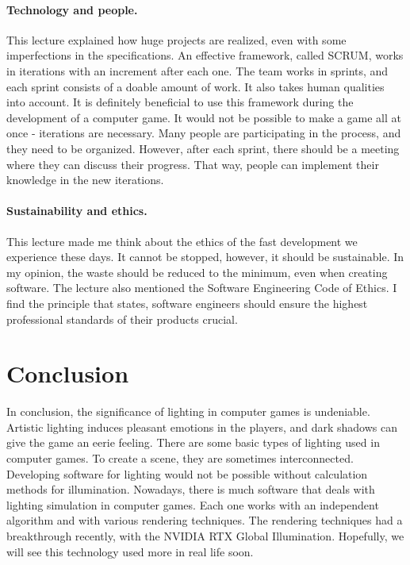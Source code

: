 \documentclass[10pt,twoside,english,a4paper]{article}
\begin{document}
\paragraph{Technology and people.}
This lecture explained how huge projects are realized, even with some imperfections in the specifications. An effective framework, called SCRUM, works in iterations with an increment after each one. The team works in sprints, and each sprint consists of a doable amount of work. It also takes human qualities into account. It is definitely beneficial to use this framework during the development of a computer game. It would not be possible to make a game all at once - iterations are necessary. Many people are participating in the process, and they need to be organized. However, after each sprint, there should be a meeting where they can discuss their progress. That way, people can implement their knowledge in the new iterations.

\paragraph{Sustainability and ethics.}
This lecture made me think about the ethics of the fast development we experience these days. It cannot be stopped, however, it should be sustainable. In my opinion, the waste should be reduced to the minimum, even when creating software. The lecture also mentioned the Software Engineering Code of Ethics. I find the principle that states, software engineers should ensure the highest professional standards of their products crucial.

\section{Conclusion} \label{seventh} 
In conclusion, the significance of lighting in computer games is undeniable. Artistic lighting induces pleasant emotions in the players, and dark shadows can give the game an eerie feeling. There are some basic types of lighting used in computer games. To create a scene, they are sometimes interconnected. Developing software for lighting would not be possible without calculation methods for illumination. Nowadays, there is much software that deals with lighting simulation in computer games. Each one works with an independent algorithm and with various rendering techniques. The rendering techniques had a breakthrough recently, with the NVIDIA RTX Global Illumination. Hopefully, we will see this technology used more in real life soon.


 
\end{document}
